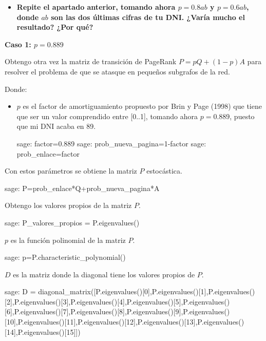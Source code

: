 \begin{ejer}
    \begin{itemize}
        \item \textbf{Repite el apartado anterior, tomando ahora $p = 0.8ab$ y $p = 0.6ab$, donde $ab$ son las dos últimas cifras de tu DNI. ¿Varía mucho el resultado? ¿Por qué?}
    \end{itemize}
\end{ejer}
\par\textbf{Caso 1: $p = 0.889$}
\par Obtengo otra vez la matriz de transición de PageRank $P=pQ + (1-p)A$ para resolver el 
problema de que se atasque en pequeños subgrafos de la red.
\par Donde:
\begin{itemize}
    \item $p$ es el factor de amortiguamiento propuesto por Brin y Page (1998) que tiene que ser un valor 
    comprendido entre [0..1], tomando ahora $p = 0.889$, puesto que mi DNI acaba en 89.
    \begin{sagecommandline}
        sage: factor=0.889
        sage: prob_nueva_pagina=1-factor
        sage: prob_enlace=factor
    \end{sagecommandline}
\end{itemize}

\par Con estos parámetros se obtiene la matriz $P$ estocástica.
\begin{sagecommandline}
    sage: P=prob_enlace*Q+prob_nueva_pagina*A
\end{sagecommandline}

\par Obtengo los valores propios de la matriz $P$.
\begin{sagecommandline}
    sage: P_valores_propios = P.eigenvalues()
\end{sagecommandline}
\par $p$ es la función polinomial de la matriz $P$.
\begin{sagecommandline}
    sage: p=P.characteristic_polynomial()
\end{sagecommandline}
\par $D$ es la matriz donde la diagonal tiene los valores propios de $P$.
\begin{sagecommandline}
    sage: D = diagonal_matrix([P.eigenvalues()[0],P.eigenvalues()[1],P.eigenvalues()[2],P.eigenvalues()[3],P.eigenvalues()[4],P.eigenvalues()[5],P.eigenvalues()[6],P.eigenvalues()[7],P.eigenvalues()[8],P.eigenvalues()[9],P.eigenvalues()[10],P.eigenvalues()[11],P.eigenvalues()[12],P.eigenvalues()[13],P.eigenvalues()[14],P.eigenvalues()[15]])
\end{sagecommandline}

